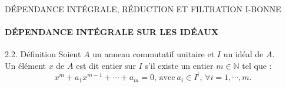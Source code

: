 \documentclass[11pt,a4paper]{beamer}
\begin{document}
\begin{frame}{DÉPENDANCE INTÉGRALE, RÉDUCTION ET FILTRATION I-BONNE}
	\framesubtitle{DÉPENDANCE INTÉGRALE SUR LES IDÉAUX}
	\begin{block}{2.2. Définition}
		Soient $A$ un anneau commutatif unitaire et $I$ un idéal de $A$.\\ Un élément $x$ de $A$ est dit entier sur $I$ s'il existe un entier $m \in \mathbb{N}$ tel que : 
		\[ 	x^m + a_1 x^{m-1} + \cdots + a_m = 0\text{, avec} \ a_i \in I^i,\, \forall i=1, \cdots ,m. \]	\pause
	\end{block}
\end{frame}



%


\end{document}
